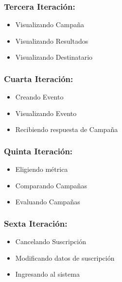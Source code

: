 \documentclass[a4paper, 11pt]{article}
\begin{document}
\subsubsection{Tercera Iteraci\'on:}
\begin{itemize}
\item Visualizando Campaña
\item Visualizando Resultados
\item Visualizando Destinatario
\end{itemize}


\subsubsection{Cuarta Iteraci\'on:}
\begin{itemize}
\item Creando Evento
\item Visualizando Evento
\item Recibiendo respuesta de Campaña
\end{itemize}


\subsubsection{Quinta Iteraci\'on:}
\begin{itemize}
\item Eligiendo métrica
\item Comparando Campañas
\item Evaluando Campañas
\end{itemize}


\subsubsection{Sexta Iteraci\'on:}
\begin{itemize}
\item Cancelando Suscripción
\item Modificando datos de suscripción
\item Ingresando al sistema
\end{itemize}
\end{document}
